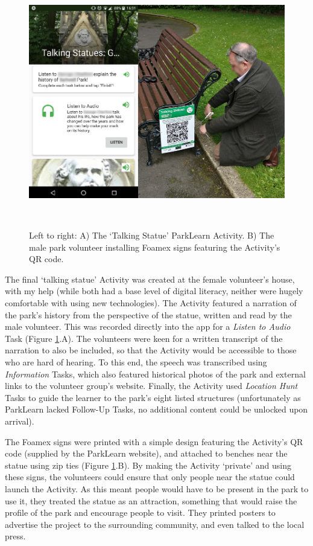 \begin{figure}
  \centering
  \includegraphics[width=0.9\columnwidth]{images/chapter06/TalkingStatue2.jpg}
  \caption[The ParkLearn `Talking Statue' Activity, and installing the signage ]{Left to right: A) The `Talking Statue' ParkLearn Activity. B) The male park volunteer installing Foamex signs featuring the Activity's QR code.}~\label{fig:TalkingStatueActivity}
\end{figure}

The final `talking statue' Activity was created at the female volunteer's house, with my help (while both had a base level of digital literacy, neither were hugely comfortable with using new technologies). The Activity featured a narration of the park's history from the perspective of the statue, written and read by the male volunteer. This was recorded directly into the app for a \textit{Listen to Audio} Task (Figure \ref{fig:TalkingStatueActivity}.A). The volunteers were keen for a written transcript of the narration to also be included, so that the Activity would be accessible to those who are hard of hearing. To this end, the speech was transcribed using \textit{Information} Tasks, which also featured historical photos of the park and external links to the volunteer group's website. Finally, the Activity used \textit{Location Hunt} Tasks to guide the learner to the park's eight listed structures (unfortunately as ParkLearn lacked Follow-Up Tasks, no additional content could be unlocked upon arrival).

The Foamex signs were printed with a simple design featuring the Activity's QR code (supplied by the ParkLearn website), and attached to benches near the statue using zip ties (Figure \ref{fig:TalkingStatueActivity}.B). By making the Activity ‘private’ and using these signs, the volunteers could ensure that only people near the statue could launch the Activity. As this meant people would have to be present in the park to use it, they treated the statue as an attraction, something that would raise the profile of the park and encourage people to visit. They printed posters to advertise the project to the surrounding community, and even talked to the local press. 

